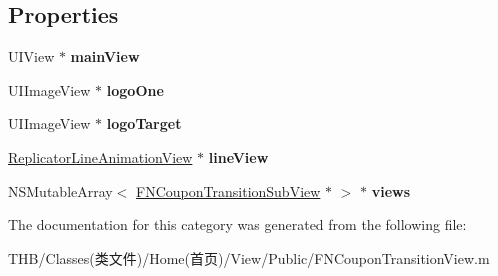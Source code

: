 \subsection*{Properties}
\begin{DoxyCompactItemize}
\item 
\mbox{\label{category_f_n_coupon_transition_view_07_08_a1581a9c0640873b9c747a114f2701a74}} 
U\+I\+View $\ast$ {\bfseries main\+View}
\item 
\mbox{\label{category_f_n_coupon_transition_view_07_08_a98caa290baa28273e2275209bcac0997}} 
U\+I\+Image\+View $\ast$ {\bfseries logo\+One}
\item 
\mbox{\label{category_f_n_coupon_transition_view_07_08_a27a6541693c7b39d974886b50790d601}} 
U\+I\+Image\+View $\ast$ {\bfseries logo\+Target}
\item 
\mbox{\label{category_f_n_coupon_transition_view_07_08_a6b5ef41bf362c0c7bf8ab048076fe211}} 
\mbox{\hyperlink{interface_replicator_line_animation_view}{Replicator\+Line\+Animation\+View}} $\ast$ {\bfseries line\+View}
\item 
\mbox{\label{category_f_n_coupon_transition_view_07_08_add8936f89811559b17af03e872d2e4ca}} 
N\+S\+Mutable\+Array$<$ \mbox{\hyperlink{interface_f_n_coupon_transition_sub_view}{F\+N\+Coupon\+Transition\+Sub\+View}} $\ast$ $>$ $\ast$ {\bfseries views}
\end{DoxyCompactItemize}


The documentation for this category was generated from the following file\+:\begin{DoxyCompactItemize}
\item 
T\+H\+B/\+Classes(类文件)/\+Home(首页)/\+View/\+Public/F\+N\+Coupon\+Transition\+View.\+m\end{DoxyCompactItemize}

